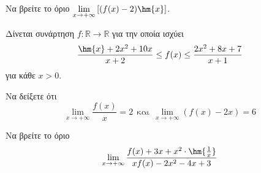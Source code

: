\documentclass[ektypwsh]{frontisthrio-diag}
\begin{document}
\begin{thema}
\begin{erwthma}
\item Να βρείτε το όριο $ \lim\limits_{x\to +\infty}{\left[(f(x)-2)\hm{x}\right]} $.
\end{erwthma}
\item Δίνεται συνάρτηση $ f:\mathbb{R}\to\mathbb{R} $ για την οποία ισχύει
\[ \frac{\hm{x}+2x^2+10x}{x+2}\leq f(x)\leq \frac{2x^2+8x+7}{x+1} \]
για κάθε $ x>0 $.
\begin{erwthma}
\item Να δείξετε ότι
\[ \lim_{x\to +\infty}{\frac{f(x)}{x}}=2\ \ \textrm{και}\ \ \lim_{x\to +\infty}{(f(x)-2x)}=6 \]
\item Να βρείτε το όριο
\[ \lim_{x\to +\infty}{\frac{f(x)+3x+x^2\cdot\hm{\frac{1}{x}}}{xf(x)-2x^2-4x+3}} \]
\end{erwthma}
\end{thema}
\end{document}
